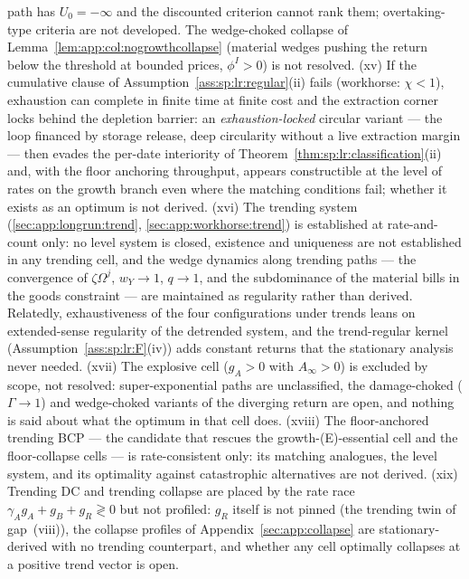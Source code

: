 path has $U_0=-\infty$ and the discounted criterion cannot rank them; overtaking-type
criteria are not developed. The wedge-choked collapse of
Lemma~\ref{lem:app:col:nogrowthcollapse} (material wedges pushing the return below the
threshold at bounded prices, $\phi^I>0$) is not resolved. (xv) If the cumulative clause of
Assumption~\ref{ass:sp:lr:regular}(ii) fails (workhorse: $\chi<1$), exhaustion can complete
in finite time at finite cost and the extraction corner locks behind the depletion barrier:
an \emph{exhaustion-locked} circular variant --- the loop financed by storage release, deep
circularity without a live extraction margin --- then evades the per-date interiority of
Theorem~\ref{thm:sp:lr:classification}(ii) and, with the floor anchoring throughput, appears
constructible at the level of rates on the growth branch even where the matching conditions
fail; whether it exists as an optimum is not derived. (xvi) The trending system
(\ref{sec:app:longrun:trend}, \ref{sec:app:workhorse:trend}) is established at
rate-and-count only: no level system is closed, existence and uniqueness are not
established in any trending cell, and the wedge dynamics along trending paths --- the
convergence of $\zeta\Omega^j$, $w_Y\to1$, $q\to1$, and the subdominance of the material
bills in the goods constraint --- are maintained as regularity rather than derived.
Relatedly, exhaustiveness of the four configurations under trends leans on extended-sense
regularity of the detrended system, and the trend-regular kernel
(Assumption~\ref{ass:sp:lr:F}(iv)) adds constant returns that the stationary analysis never
needed. (xvii) The explosive cell ($g_A>0$ with $A_\infty>0$) is excluded by scope, not
resolved: super-exponential paths are unclassified, the damage-choked
($\Gamma\to1$) and wedge-choked variants of the diverging return are open, and nothing is
said about what the optimum in that cell does. (xviii) The floor-anchored trending BCP ---
the candidate that rescues the growth-(E)-essential cell and the floor-collapse cells ---
is rate-consistent only: its matching analogues, the level system, and its optimality
against catastrophic alternatives are not derived. (xix) Trending DC and trending collapse
are placed by the rate race $\gamma_Ag_A+g_B+g_R\gtrless0$ but not profiled: $g_R$ itself
is not pinned (the trending twin of gap~(viii)), the collapse profiles of
Appendix~\ref{sec:app:collapse} are stationary-derived with no trending counterpart, and
whether any cell optimally collapses at a positive trend vector is open.
